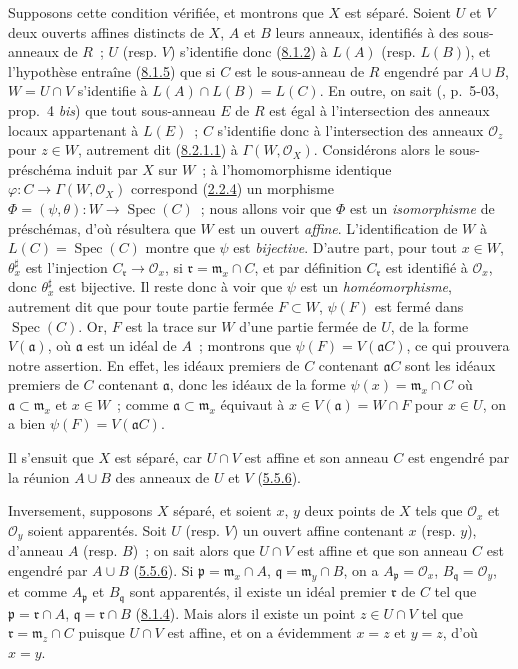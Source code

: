 Supposons cette condition vérifiée, et montrons que $X$ est séparé. Soient
$U$ et $V$ deux ouverts affines distincts de $X$, $A$ et $B$ leurs anneaux,
identifiés à des sous-anneaux de $R$~; $U$ (resp. $V$) s'identifie donc
(\hyperref[I.8.1.2-fr]{8.1.2}) à $L(A)$ (resp. $L(B)$), et l'hypothèse
entraîne (\hyperref[I.8.1.5-fr]{8.1.5}) que si $C$ est le sous-anneau de $R$
engendré par $A\cup B$, $W=U\cap V$ s'identifie à
$L(A)\cap L(B)=L(C)$. En outre, on sait
(\cite{I-1}, p.~5-03, prop.~4 \emph{bis}) que tout sous-anneau $E$ de $R$ est
égal à l'intersection des anneaux locaux appartenant à $L(E)$~; $C$
s'identifie donc à l'intersection des anneaux $\mathscr{O}_z$ pour $z\in W$,
autrement dit (\hyperref[I.8.2.1.1-fr]{8.2.1.1}) à
$\Gamma(W,\mathscr{O}_X)$. Considérons alors le sous-préschéma induit par $X$
sur $W$~; à l'homomorphisme identique
$\varphi:C\to\Gamma(W,\mathscr{O}_X)$ correspond
(\hyperref[I.2.2.4-fr]{2.2.4}) un morphisme
$\Phi=(\psi,\theta):W\to\operatorname{Spec}(C)$~; nous allons voir que $\Phi$
est un \emph{isomorphisme} de préschémas, d'où résultera que $W$ est un ouvert
\emph{affine}. L'identification de $W$ à
$L(C)=\operatorname{Spec}(C)$ montre que $\psi$ est \emph{bijective}. D'autre
part, pour tout $x\in W$, $\theta_x^\sharp$ est l'injection
$C_\mathfrak r\to\mathscr{O}_x$, si
$\mathfrak r=\mathfrak m_x\cap C$, et par définition $C_\mathfrak r$ est
identifié à $\mathscr{O}_x$, donc $\theta_x^\sharp$ est bijective. Il reste
donc à voir que $\psi$ est un \emph{homéomorphisme}, autrement dit que pour
toute partie fermée $F\subset W$, $\psi(F)$ est fermé dans
$\operatorname{Spec}(C)$. Or, $F$ est la trace sur $W$ d'une partie fermée de
$U$, de la forme $V(\mathfrak a)$, où $\mathfrak a$ est un idéal de $A$~;
montrons que $\psi(F)=V(\mathfrak a C)$, ce qui prouvera notre assertion. En
effet, les idéaux premiers de $C$ contenant $\mathfrak a C$ sont les idéaux
premiers de $C$ contenant $\mathfrak a$, donc les idéaux de la forme
$\psi(x)=\mathfrak m_x\cap C$ où
$\mathfrak a\subset\mathfrak m_x$ et $x\in W$~; comme
$\mathfrak a\subset\mathfrak m_x$ équivaut à
$x\in V(\mathfrak a)=W\cap F$ pour $x\in U$, on a bien
$\psi(F)=V(\mathfrak a C)$.

Il s'ensuit que $X$ est séparé, car $U\cap V$ est affine et son anneau $C$ est
engendré par la réunion $A\cup B$ des anneaux de $U$ et $V$
(\hyperref[I.5.5.6-fr]{5.5.6}).

Inversement, supposons $X$ séparé, et soient $x$, $y$ deux points de $X$ tels
que $\mathscr{O}_x$ et $\mathscr{O}_y$ soient apparentés. Soit $U$ (resp.
$V$) un ouvert affine contenant $x$ (resp. $y$), d'anneau $A$ (resp. $B$)~;
on sait alors que $U\cap V$ est affine et que son anneau $C$ est engendré par
$A\cup B$ (\hyperref[I.5.5.6-fr]{5.5.6}). Si
$\mathfrak p=\mathfrak m_x\cap A$, $\mathfrak q=\mathfrak m_y\cap B$, on a
$A_\mathfrak p=\mathscr{O}_x$, $B_\mathfrak q=\mathscr{O}_y$, et comme
$A_\mathfrak p$ et $B_\mathfrak q$ sont apparentés, il existe un idéal premier
$\mathfrak r$ de $C$ tel que $\mathfrak p=\mathfrak r\cap A$,
$\mathfrak q=\mathfrak r\cap B$ (\hyperref[I.8.1.4-fr]{8.1.4}). Mais alors il
existe un point $z\in U\cap V$ tel que
$\mathfrak r=\mathfrak m_z\cap C$ puisque $U\cap V$ est affine, et on a
évidemment $x=z$ et $y=z$, d'où $x=y$.

